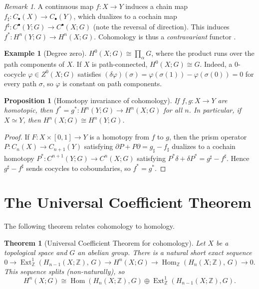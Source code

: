 \documentclass[12pt,a4paper,openany]{book}
\theoremstyle{definition}
\newtheorem{example}[definition]{Example}
\theoremstyle{plain}
\newtheorem{theorem}[definition]{Theorem}
\newtheorem{proposition}[definition]{Proposition}
\theoremstyle{remark}
\newtheorem{remark}[definition]{Remark}
\newcommand{\Z}{\mathbb{Z}}
\DeclareMathOperator{\Hom}{Hom}
\begin{document}
\begin{remark}
A continuous map $f\colon X\to Y$ induces a chain map
$f_\sharp\colon C_\bullet(X)\to C_\bullet(Y)$, which dualizes to a
cochain map $f^\sharp\colon C^\bullet(Y;G)\to C^\bullet(X;G)$
(note the reversal of direction). This induces
$f^*\colon H^n(Y;G)\to H^n(X;G)$.
Cohomology is thus a \emph{contravariant} functor%
.
\end{remark}

\begin{example}[Degree zero]
$H^0(X;G)\cong\prod_{\alpha}G$, where the product runs over the
path components of $X$. If $X$ is path-connected, $H^0(X;G)\cong G$.
Indeed, a $0$-cocycle $\varphi\in Z^0(X;G)$ satisfies
$(\delta\varphi)(\sigma)=\varphi(\sigma(1))-\varphi(\sigma(0))=0$
for every path $\sigma$, so $\varphi$ is constant on path components.
\end{example}

\begin{proposition}[Homotopy invariance of cohomology]
\label{prop:coh-homotopy-invariance}
If $f,g\colon X\to Y$ are homotopic, then $f^*=g^*\colon H^n(Y;G)\to H^n(X;G)$
for all $n$. In particular, if $X\simeq Y$, then $H^n(X;G)\cong H^n(Y;G)$.
\end{proposition}

\begin{proof}
If $F\colon X\times[0,1]\to Y$ is a homotopy from $f$ to $g$, then
the prism operator $P\colon C_n(X)\to C_{n+1}(Y)$ satisfying
$\partial P + P\partial = g_\sharp - f_\sharp$ dualizes to a cochain
homotopy $P^*\colon C^{n+1}(Y;G)\to C^n(X;G)$ satisfying
$P^*\delta + \delta P^* = g^\sharp - f^\sharp$. Hence
$g^\sharp - f^\sharp$ sends cocycles to coboundaries, so $f^*=g^*$.
\end{proof}

\section{The Universal Coefficient Theorem}
\label{sec:uct}

The following theorem relates cohomology to homology.

\begin{theorem}[Universal Coefficient Theorem for cohomology]
\label{thm:uct}
Let $X$ be a topological space and $G$ an abelian group. There is a
natural short exact sequence
\[
  0 \to \operatorname{Ext}^1_\Z(H_{n-1}(X;\Z),\,G)
    \to H^n(X;G)
    \to \Hom_\Z(H_n(X;\Z),\,G) \to 0.
\]
This sequence splits (non-naturally), so
\[
  H^n(X;G) \cong \Hom(H_n(X;\Z),G)
    \oplus\operatorname{Ext}^1_\Z(H_{n-1}(X;\Z),G).
\]
\end{theorem}
\end{document}
